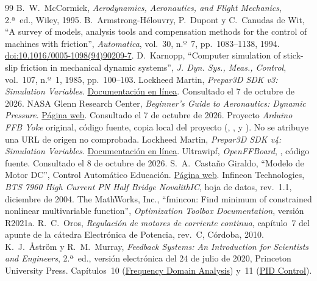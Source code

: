 \begin{thebibliography}{99}
 B.~W.~McCormick, \emph{Aerodynamics, Aeronautics, and Flight Mechanics}, 2.ª~ed., Wiley, 1995.
 B.~Armstrong-Hélouvry, P.~Dupont y C.~Canudas de Wit, ``A survey of models, analysis tools and compensation methods for the control of machines with friction'', \emph{Automatica}, vol.~30, n.º~7, pp.~1083--1138, 1994. \href{https://doi.org/10.1016/0005-1098(94)90209-7}{doi:10.1016/0005-1098(94)90209-7}.
 D.~Karnopp, ``Computer simulation of stick-slip friction in mechanical dynamic systems'', \emph{J. Dyn. Sys., Meas., Control}, vol.~107, n.º~1, 1985, pp.~100--103.
 Lockheed Martin, \emph{Prepar3D SDK v3: Simulation Variables}. \href{https://www.prepar3d.com/SDKv3/LearningCenter/utilities/variables/simulation_variables.html}{Documentación en línea}. Consultado el 7 de octubre de 2026.
 NASA Glenn Research Center, \emph{Beginner's Guide to Aeronautics: Dynamic Pressure}. \href{https://www1.grc.nasa.gov/beginners-guide-to-aeronautics/dynamic-pressure-2/}{Página web}. Consultado el 7 de octubre de 2026.
 Proyecto \emph{Arduino FFB Yoke} original, código fuente, copia local del proyecto (, ,  y ). No se atribuye una URL de origen no comprobada.
 Lockheed Martin, \emph{Prepar3D SDK v4: Simulation Variables}. \href{https://www.prepar3d.com/SDKv4/sdk/references/variables/simulation_variables.html}{Documentación en línea}.
 Ultrawipf, \emph{OpenFFBoard}, \href{https://github.com/Ultrawipf/OpenFFBoard/blob/master/Firmware/FFBoard/Src/EffectsCalculator.cpp}{}, código fuente. Consultado el 8 de octubre de 2026.
 S.~A.~Castaño Giraldo, ``Modelo de Motor DC'', Control Automático Educación. \href{https://controlautomaticoeducacion.com/analisis-de-sistemas/modelo-de-motor-dc/}{Página web}.
 Infineon Technologies, \emph{BTS 7960 High Current PN Half Bridge NovalithIC}, hoja de datos, rev.~1.1, diciembre de 2004.
 The MathWorks, Inc., ``fmincon: Find minimum of constrained nonlinear multivariable function'', \emph{Optimization Toolbox Documentation}, versión R2021a.
 R.~C.~Oros, \emph{Regulación de motores de corriente continua}, capítulo~7 del apunte de la cátedra Electrónica de Potencia, rev.~C, Córdoba, 2010.
 K.~J.~Åström y R.~M.~Murray, \emph{Feedback Systems: An Introduction for Scientists and Engineers}, 2.ª~ed., versión electrónica del 24 de julio de 2020, Princeton University Press. Capítulos~10 (\href{http://www.cds.caltech.edu/~murray/books/AM08/pdf/fbs-loopanal_24Jul2020.pdf}{Frequency Domain Analysis}) y~11 (\href{http://www.cds.caltech.edu/~murray/books/AM08/pdf/fbs-pid_24Jul2020.pdf}{PID Control}).

\end{thebibliography}
